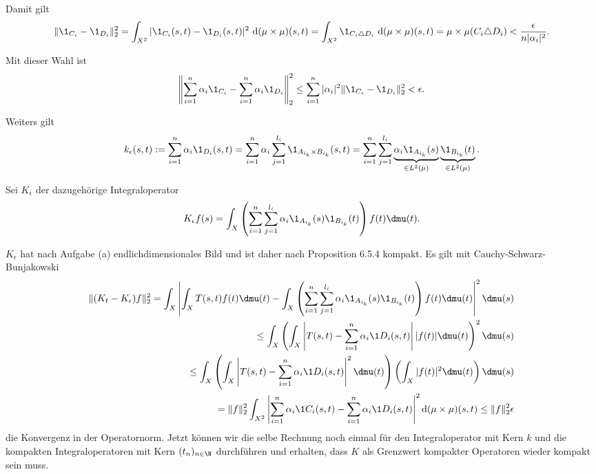 \begin{solution}
\begin{enumerate}[label = (\alph*)]
Damit gilt
\begin{align*}
    \|\1_{C_i} - \1_{D_i}\|_2^2 = \int_{X^2} |\1_{C_i}(s,t) - \1_{D_i}(s,t)|^2
     ~\mathrm{d}(\mu\times\mu)(s,t) = \int_{X^2} \1_{C_i \triangle D_i}~\mathrm{d}(\mu\times\mu)(s,t) =
     \mu\times\mu(C_i \triangle D_i) < \/
     \frac{\epsilon}{n|\alpha_i|^2}.
\end{align*}


Mit dieser Wahl ist
\begin{align*}
    \left\| \sum_{i = 1}^n \alpha_i \1_{C_i} -
    \sum_{i = 1}^n \alpha_i \1_{D_i}\right\|_2^2
    \leq \sum_{i=1}^{n} |\alpha_{i}|^2 \|\1_{C_{i}} - \1_{D_{i}} \|_2^2 < \epsilon.
\end{align*}

Weiters gilt
\begin{align*}
    k_{\epsilon}(s,t) := \sum_{i = 1}^n \alpha_i \1_{D_i}(s,t)
    = \sum_{i=1}^{n} \alpha_{i} \sum_{j=1}^{l_{i}}  \1_{A_{i_k} \times B_{i_k}}(s,t)
    = \sum_{i=1}^{n} \sum_{j=1}^{l_{i}}   \underbrace{\alpha_{i} \1_{A_{i_k}}(s)}_{\in L^2(\mu)}
     \underbrace{\1_{B_{i_k}}(t)}_{\in L^2(\mu)}.
\end{align*}

Sei $K_{\epsilon}$ der dazugehörige Integraloperator
\begin{align*}
  K_{\epsilon} f(s) = \int_X \left(\sum_{i=1}^{n} \sum_{j=1}^{l_{i}}   \alpha_{i} \1_{A_{i_k}}(s) \1_{B_{i_k}}(t)\right) f(t) \dmu(t).
\end{align*}

$K_{\epsilon}$ hat nach Aufgabe (a) endlichdimensionales Bild und ist daher nach Proposition 6.5.4 kompakt. Es gilt mit Cauchy-Schwarz-Bunjakowski
\begin{align*}
    \|(K_t-K_{\epsilon}) f\|_2^2 = \int_X \left| \int_X T(s,t) f(t) \dmu(t) - \int_X \left(\sum_{i=1}^{n} \sum_{j=1}^{l_{i}}   \alpha_{i} \1_{A_{i_k}}(s) \1_{B_{i_k}}(t)\right) f(t) \dmu(t) \right|^2 \dmu(s) \\
    \leq \int_X \left( \int_X \left|T(s,t) - \sum_{i = 1}^n \alpha_i \1D_i(s,t)\right| |f(t)| \dmu(t)\right)^2 \dmu(s) \\
    \leq \int_X \left(\int_X \left|T(s,t) - \sum_{i = 1}^n \alpha_i \1D_i(s,t)\right|^2 \dmu(t)\right) \left(\int_X |f(t)|^2 \dmu(t)\right) \dmu(s) \\
    = \|f\|_2^2\int_{X^2} \left| \sum_{i = 1}^n \alpha_i \1C_i(s,t) -
    \sum_{i = 1}^n \alpha_i \1D_i(s,t)\right|^2 \mathrm{d}(\mu\times\mu)(s,t) \leq \|f\|_2^2\epsilon
\end{align*}
die Konvergenz in der Operatornorm.
Jetzt können wir die selbe Rechnung noch einmal für den Integraloperator mit Kern $k$
und die kompakten Integraloperatoren mit Kern $(t_n)_{n \in \N}$ durchführen und
erhalten, dass $K$ als Grenzwert kompakter Operatoren wieder kompakt sein muss.

\end{enumerate}

\end{solution}
